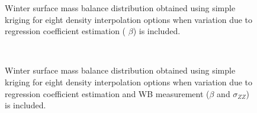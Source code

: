 \documentclass{sfuthesis}
\begin{document}
\begin{appendices}
\begin{figure}
	\caption[]{Winter surface mass balance distribution obtained using simple kriging for eight density interpolation options when variation due to regression coefficient estimation ( $\beta$) is included. }
	\label{fig:WSMB_SK_Distributionbeta}
\end{figure}

\begin{figure}
	\centering
	\\
	\caption[]{Winter surface mass balance distribution obtained using simple kriging for eight density interpolation options when variation due to regression coefficient estimation and WB measurement ($\beta$ and $\sigma_{ZZ}$) is included. }
	\label{fig:WSMB_SK_DistributionbetaNzz}
\end{figure}


\end{appendices}
\end{document}
